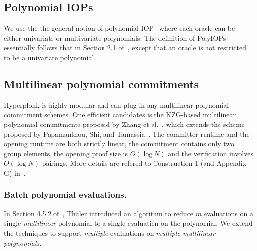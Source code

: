 \subsection{Polynomial IOPs}
We use the the general notion of polynomial IOP~\cite{BFS20,CHMMVW20} where each oracle
can be either univariate or multivariate polynomials.
The definition of PolyIOPs essentially follows that in Section 2.1 of~\cite{CHMMVW20}, except
that an oracle is not restricted to be a univariate polynomial.

\subsection{Multilinear polynomial commitments}
Hyperplonk is highly modular and can plug in any multilinear polynomial commitment schemes.
One efficient candidates is the KZG-based multilinear polynomial commitments proposed by Zhang et al.~\cite{ZGK+18},
which extends the scheme proposed by Papamanthou, Shi, and Tamassia~\cite{PST13}.
The committer runtime and the opening runtime are both strictly linear, the commitment contains only 
two group elements, the opening proof size is $O(\log N)$ and the verification involves $O(\log N)$
pairings.
More details are refered to Construction 1 (and Appendix G) in~\cite{ZGK+18}.

\subsubsection*{Batch polynomial evaluations.}
In Section 4.5.2 of~\cite{thaler20}, Thaler introduced an algorithm to reduce $m$ evaluations on a single 
\emph{multilinear} polynomial to a single evaluation on the polynomial. 
We extend the techniques to support \emph{multiple} evaluations on \emph{multiple multilinear polynomials}.
